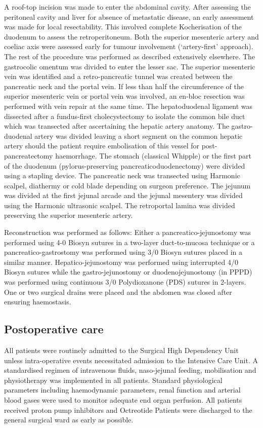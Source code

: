 A roof-top incision was made to enter the abdominal cavity. After assessing the peritoneal cavity and liver for absence of metastatic disease, an early assessment was made for local resectability. This involved complete Kocherisation of the duodenum to assess the retroperitoneum. Both the superior mesenteric artery and coeliac axis were assessed early for tumour involvement (‘artery-first’ approach). The rest of the procedure was performed as described extensively elsewhere. The gastrocolic omentum was divided to enter the lesser sac. The superior mesenteric vein was identified and a retro-pancreatic tunnel was created between the pancreatic neck and the portal vein. If less than half the circumference of the superior mesenteric vein or portal vein was involved, an en-bloc resection was performed with vein repair at the same time. The hepatoduodenal ligament was dissected after a fundus-first cholecystectomy to isolate the common bile duct which was transected after ascertaining the hepatic artery anatomy. The gastro-duodenal artery was divided leaving a short segment on the common hepatic artery should the patient require embolisation of this vessel for post-pancreatectomy haemorrhage. The stomach (classical Whipple) or the first part of the duodenum (pylorus-preserving pancreaticoduodenectomy) were divided using a stapling device. The pancreatic neck was transected using Harmonic scalpel, diathermy or cold blade depending on surgeon preference. The jejunum was divided at the first jejunal arcade and the jejunal mesentery was divided using the Harmonic ultrasonic scalpel. The retroportal lamina was divided preserving the superior mesenteric artery. 

Reconstruction was performed as follows: Either a pancreatico-jejunostomy was performed using 4-0 Biosyn sutures in a two-layer duct-to-mucosa technique or a pancreatico-gastrostomy was performed using 3/0 Biosyn sutures placed in a similar manner. Hepatico-jejunostomy was performed using interrupted 4/0 Biosyn sutures while the gastro-jejunostomy or duodenojejunostomy (in PPPD) was performed using continuous 3/0 Polydioxanone (PDS) sutures in 2-layers. One or two surgical drains were placed and the abdomen was closed after ensuring haemostasis.

\subsection{Postoperative care}
All patients were routinely admitted to the Surgical High Dependency Unit unless intra-operative events necessitated admission to the Intensive Care Unit. A standardised regimen of intravenous fluids, naso-jejunal feeding, mobilisation and physiotherapy was implemented in all patients. Standard physiological parameters including haemodynamic parameters, renal function and arterial blood gases were used to monitor adequate end organ perfusion. All patients received proton pump inhibitors and Octreotide Patients were discharged to the general surgical ward as early as possible.

